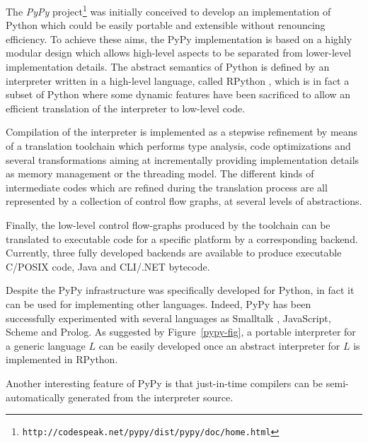 The \emph{PyPy} project\footnote{\texttt{http://codespeak.net/pypy/dist/pypy/doc/home.html}}
\cite{RigoPedroni06} was initially conceived to develop an implementation of Python which
could be easily portable and extensible without renouncing efficiency.
To achieve these aims, the PyPy implementation is based on a highly
modular design which allows high-level aspects
to be separated from lower-level implementation details.
The abstract semantics of Python is defined by an interpreter written
in a high-level language, called RPython \cite{AACM-DLS07}, which is in fact a subset of
Python where some dynamic features have been sacrificed to allow an
efficient translation of the interpreter to low-level code.

Compilation of the interpreter is implemented as a stepwise
refinement by means of a translation toolchain which performs type
analysis, code optimizations and several transformations aiming at 
incrementally providing implementation details as memory management or the threading model.
The different kinds of intermediate codes  which are refined 
during the translation process are all represented by a collection of control flow graphs,
at several levels of abstractions.

Finally, the low-level control flow-graphs produced by the toolchain
can be translated to executable code for a specific platform by a
corresponding backend.
Currently, three fully developed backends are available to produce
executable C/POSIX code, Java and CLI/.NET bytecode. 

Despite the PyPy infrastructure was specifically developed 
for Python, in fact it can be used for implementing
other languages. Indeed, PyPy has been successfully experimented with
several languages as Smalltalk \cite{BolzEtAl08}, JavaScript, Scheme and Prolog.
As suggested by Figure~\ref{pypy-fig}, a portable interpreter for a
generic language $L$  can be
easily developed once an abstract interpreter for $L$ is implemented in
RPython.

Another interesting feature of PyPy
is that just-in-time compilers can be semi-automatically generated from the
interpreter source.
